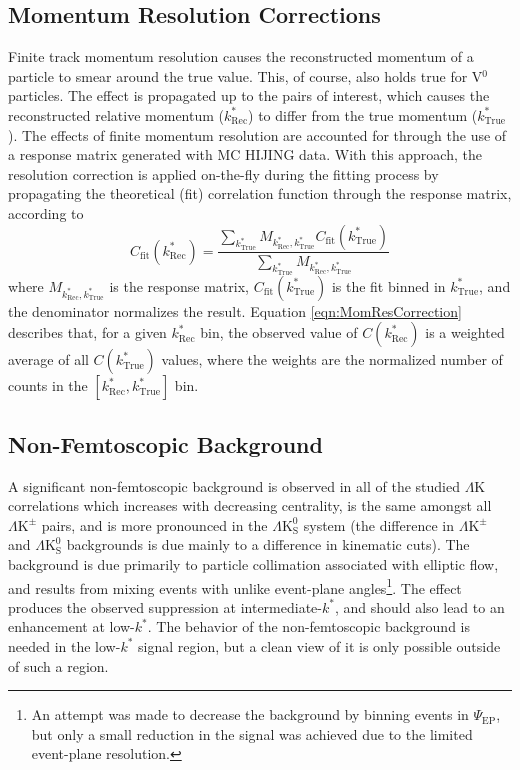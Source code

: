 \documentclass[ALICE,manyauthors]{cernphprep}
\newcommand{\kstar}{$k^{*}$\xspace}
\newcommand{\ktrue}{$k^{*}_{\mathrm{True}}$\xspace}
\newcommand{\krec}{$k^{*}_{\mathrm{Rec}}$\xspace}
\newcommand{\LamK}{$\Lambda$K\xspace}
\newcommand{\LamKpm}{$\Lambda\mathrm{K^{\pm}}$\xspace}
\newcommand{\LamKs}{$\Lambda\mathrm{K^{0}_{S}}$\xspace}
\newcommand{\Vz}{V$^{0}$\xspace}
\begin{document}
\subsection{Momentum Resolution Corrections}
\label{MomentumResolutionCorrections}

Finite track momentum resolution causes the reconstructed momentum of a particle to smear around the true value.
This, of course, also holds true for \Vz particles.
The effect is propagated up to the pairs of interest, which causes the reconstructed relative momentum (\krec) to differ from the true momentum (\ktrue).
The effects of finite momentum resolution are accounted for through the use of a response matrix generated with MC HIJING data.
With this approach, the resolution correction is applied on-the-fly during the fitting process by propagating the theoretical (fit) correlation function through the response matrix, according to
\begin{equation}
  C_{\mathrm{fit}}(k^{*}_{\mathrm{Rec}}) = \dfrac{\sum\limits_{k^{*}_{\mathrm{True}}}M_{k^{*}_{\mathrm{Rec}},k^{*}_{\mathrm{True}}}C_{\mathrm{fit}}(k^{*}_{\mathrm{True}})}{\sum\limits_{k^{*}_{\mathrm{True}}}M_{k^{*}_{\mathrm{Rec}},k^{*}_{\mathrm{True}}}}
\label{eqn:MomResCorrection}
\end{equation}
where $M_{k^{*}_{\mathrm{Rec}},k^{*}_{\mathrm{True}}}$ is the response matrix, $C_{\mathrm{fit}}(k^{*}_{\mathrm{True}})$ is the fit binned in \ktrue, and the denominator normalizes the result.
Equation \ref{eqn:MomResCorrection} describes that, for a given \krec bin, the observed value of $C(k^{*}_{\mathrm{Rec}})$ is a weighted average of all $C(k^{*}_{\mathrm{True}})$ values, where the weights are the normalized number of counts in the \mbox{$[k^{*}_{\mathrm{Rec}}, k^{*}_{\mathrm{True}}]$} bin.



\subsection{Non-Femtoscopic Background}
\label{NonFlatBackground}

A significant non-femtoscopic background is observed in all of the studied \LamK correlations which increases with decreasing centrality, is the same amongst all \LamKpm pairs, and is more pronounced in the \LamKs system (the difference in \LamKpm and \LamKs backgrounds is due mainly to a difference in kinematic cuts).  
The background is due primarily to particle collimation associated with elliptic flow, and results from mixing events with unlike event-plane angles\footnote[1]
{
An attempt was made to decrease the background by binning events in $\Psi_{\mathrm{EP}}$, but only a small reduction in the signal was achieved due to the limited event-plane resolution.
}\cite{Kisiel:2017}.
The effect produces the observed suppression at intermediate-\kstar, and should also lead to an enhancement at low-\kstar.
The behavior of the non-femtoscopic background is needed in the low-\kstar signal region, but a clean view of it is only possible outside of such a region.
\end{document}
